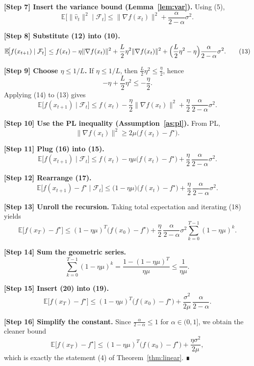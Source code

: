 \documentclass{article}
\newcommand{\E}{\mathbb{E}}
\begin{document}
\noindent\textbf{[Step 7] Insert the variance bound (Lemma~\ref{lem:var}).}
Using (5),
\[
\E\!\bigl[\|\widehat v_{t}\|^{2}\mid\mathcal{F}_{t}\bigr]
\le \|\nabla f(x_{t})\|^{2} + \frac{\alpha}{2-\alpha}\sigma^{2}. \tag{12}
\]

\noindent\textbf{[Step 8] Substitute (12) into (10).}
\[
\E\!\bigl[f(x_{t+1})\mid\mathcal{F}_{t}\bigr]
\le f(x_{t}) -\eta\|\nabla f(x_{t})\|^{2}
    +\frac{L}{2}\eta^{2}\|\nabla f(x_{t})\|^{2}
    +\Bigl(\frac{L}{2}\eta^{2}-\eta\Bigr)\frac{\alpha}{2-\alpha}\sigma^{2}. \tag{13}
\]

\noindent\textbf{[Step 9] Choose $\eta\le 1/L$.}  
If $\eta\le 1/L$, then $ \frac{L}{2}\eta^{2}\le \frac{\eta}{2}$, hence
\[
-\eta +\frac{L}{2}\eta^{2}\le -\frac{\eta}{2}. \tag{14}
\]
Applying (14) to (13) gives
\[
\E\!\bigl[f(x_{t+1})\mid\mathcal{F}_{t}\bigr]
\le f(x_{t}) -\frac{\eta}{2}\|\nabla f(x_{t})\|^{2}
    +\frac{\eta}{2}\,\frac{\alpha}{2-\alpha}\sigma^{2}. \tag{15}
\]

\noindent\textbf{[Step 10] Use the PL inequality (Assumption~\ref{as:pl}).}  
From PL,
\[
\|\nabla f(x_{t})\|^{2}\ge 2\mu\bigl(f(x_{t})-f^{\star}\bigr). \tag{16}
\]

\noindent\textbf{[Step 11] Plug (16) into (15).}
\[
\E\!\bigl[f(x_{t+1})\mid\mathcal{F}_{t}\bigr]
\le f(x_{t}) -\eta\mu\bigl(f(x_{t})-f^{\star}\bigr)
    +\frac{\eta}{2}\,\frac{\alpha}{2-\alpha}\sigma^{2}. \tag{17}
\]

\noindent\textbf{[Step 12] Rearrange (17).}
\[
\E\!\bigl[f(x_{t+1})-f^{\star}\mid\mathcal{F}_{t}\bigr]
\le \bigl(1-\eta\mu\bigr)\bigl(f(x_{t})-f^{\star}\bigr)
    +\frac{\eta}{2}\,\frac{\alpha}{2-\alpha}\sigma^{2}. \tag{18}
\]

\noindent\textbf{[Step 13] Unroll the recursion.}  
Taking total expectation and iterating (18) yields
\[
\E\!\bigl[f(x_{T})-f^{\star}\bigr]
\le (1-\eta\mu)^{T}\bigl(f(x_{0})-f^{\star}\bigr)
   +\frac{\eta}{2}\,\frac{\alpha}{2-\alpha}\sigma^{2}
     \sum_{k=0}^{T-1}(1-\eta\mu)^{k}. \tag{19}
\]

\noindent\textbf{[Step 14] Sum the geometric series.}
\[
\sum_{k=0}^{T-1}(1-\eta\mu)^{k}
= \frac{1-(1-\eta\mu)^{T}}{\eta\mu}
\le \frac{1}{\eta\mu}. \tag{20}
\]

\noindent\textbf{[Step 15] Insert (20) into (19).}
\[
\E\!\bigl[f(x_{T})-f^{\star}\bigr]
\le (1-\eta\mu)^{T}\bigl(f(x_{0})-f^{\star}\bigr)
   +\frac{\sigma^{2}}{2\mu}\,\frac{\alpha}{2-\alpha}. \tag{21}
\]

\noindent\textbf{[Step 16] Simplify the constant.}  
Since $\frac{\alpha}{2-\alpha}\le1$ for $\alpha\in(0,1]$, we obtain the cleaner bound
\[
\E\!\bigl[f(x_{T})-f^{\star}\bigr]
\le (1-\eta\mu)^{T}\bigl(f(x_{0})-f^{\star}\bigr)
   +\frac{\eta\sigma^{2}}{2\mu},
\]
which is exactly the statement (4) of Theorem~\ref{thm:linear}. ∎
\end{document}
